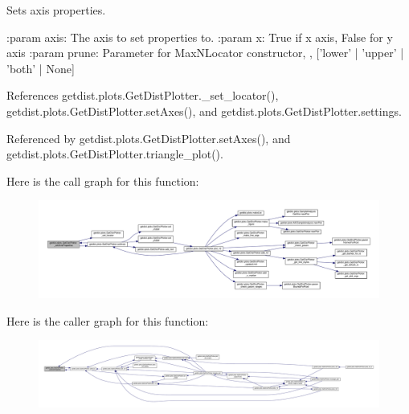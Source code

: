 \begin{DoxyVerb}Sets axis properties.

:param axis: The axis to set properties to.
:param x: True if x axis, False for y axis
:param prune: Parameter for MaxNLocator constructor, ,  ['lower' | 'upper' | 'both' | None]
\end{DoxyVerb}
 

References getdist.\+plots.\+Get\+Dist\+Plotter.\+\_\+set\+\_\+locator(), getdist.\+plots.\+Get\+Dist\+Plotter.\+set\+Axes(), and getdist.\+plots.\+Get\+Dist\+Plotter.\+settings.



Referenced by getdist.\+plots.\+Get\+Dist\+Plotter.\+set\+Axes(), and getdist.\+plots.\+Get\+Dist\+Plotter.\+triangle\+\_\+plot().

Here is the call graph for this function\+:
\nopagebreak
\begin{figure}[H]
\begin{center}
\leavevmode
\includegraphics[width=350pt]{classgetdist_1_1plots_1_1GetDistPlotter_a437576fb88e47274ce1c2574581daf2c_cgraph}
\end{center}
\end{figure}
Here is the caller graph for this function\+:
\nopagebreak
\begin{figure}[H]
\begin{center}
\leavevmode
\includegraphics[width=350pt]{classgetdist_1_1plots_1_1GetDistPlotter_a437576fb88e47274ce1c2574581daf2c_icgraph}
\end{center}
\end{figure}
\mbox{\label{classgetdist_1_1plots_1_1GetDistPlotter_a0f88fbf39ce5aa636bcb33ba1aaf26dd}} 
